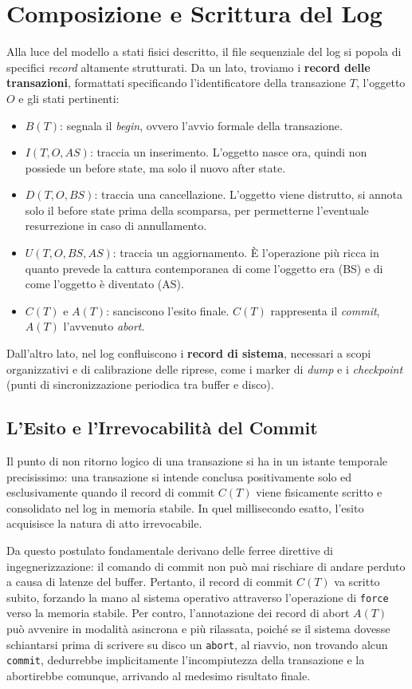\section{Composizione e Scrittura del Log}

Alla luce del modello a stati fisici descritto, il file sequenziale del log si popola di specifici \textit{record} altamente strutturati.
Da un lato, troviamo i \textbf{record delle transazioni}, formattati specificando l'identificatore della transazione $T$, l'oggetto $O$ e gli stati pertinenti:
\begin{itemize}
    \item $B(T)$: segnala il \textit{begin}, ovvero l'avvio formale della transazione.
    \item $I(T, O, AS)$: traccia un inserimento. L'oggetto nasce ora, quindi non possiede un before state, ma solo il nuovo after state.
    \item $D(T, O, BS)$: traccia una cancellazione. L'oggetto viene distrutto, si annota solo il before state prima della scomparsa, per permetterne l'eventuale resurrezione in caso di annullamento.
    \item $U(T, O, BS, AS)$: traccia un aggiornamento. È l'operazione più ricca in quanto prevede la cattura contemporanea di come l'oggetto era (BS) e di come l'oggetto è diventato (AS).
    \item $C(T)$ e $A(T)$: sanciscono l'esito finale. $C(T)$ rappresenta il \textit{commit}, $A(T)$ l'avvenuto \textit{abort}.
\end{itemize}

Dall'altro lato, nel log confluiscono i \textbf{record di sistema}, necessari a scopi organizzativi e di calibrazione delle riprese, come i marker di \textit{dump} e i \textit{checkpoint} (punti di sincronizzazione periodica tra buffer e disco).

\subsection{L'Esito e l'Irrevocabilità del Commit}

Il punto di non ritorno logico di una transazione si ha in un istante temporale precisissimo: una transazione si intende conclusa positivamente solo ed esclusivamente quando il record di commit $C(T)$ viene fisicamente scritto e consolidato nel log in memoria stabile. In quel millisecondo esatto, l'esito acquisisce la natura di atto irrevocabile.

Da questo postulato fondamentale derivano delle ferree direttive di ingegnerizzazione: il comando di commit non può mai rischiare di andare perduto a causa di latenze del buffer. Pertanto, il record di commit $C(T)$ va scritto subito, forzando la mano al sistema operativo attraverso l'operazione di \texttt{force} verso la memoria stabile. Per contro, l'annotazione dei record di abort $A(T)$ può avvenire in modalità asincrona e più rilassata, poiché se il sistema dovesse schiantarsi prima di scrivere su disco un \texttt{abort}, al riavvio, non trovando alcun \texttt{commit}, dedurrebbe implicitamente l'incompiutezza della transazione e la abortirebbe comunque, arrivando al medesimo risultato finale.

